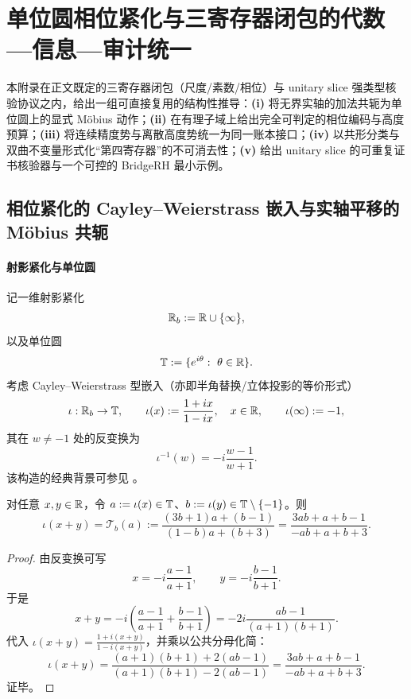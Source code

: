 \section{单位圆相位紧化与三寄存器闭包的代数—信息—审计统一}\label{app:phase-compactification-register-unification}

本附录在正文既定的三寄存器闭包（尺度/素数/相位）与 unitary slice 强类型核验协议之内，给出一组可直接复用的结构性推导：\textbf{(i)} 将无界实轴的加法共轭为单位圆上的显式 Möbius 动作；\textbf{(ii)} 在有理子域上给出完全可判定的相位编码与高度预算；\textbf{(iii)} 将连续精度势与离散高度势统一为同一账本接口；\textbf{(iv)} 以共形分类与双曲不变量形式化“第四寄存器”的不可消去性；\textbf{(v)} 给出 unitary slice 的可重复证书核验器与一个可控的 BridgeRH 最小示例。

\subsection{相位紧化的 Cayley--Weierstrass 嵌入与实轴平移的 Möbius 共轭}\label{subsec:app29-cayley-mobius}

\paragraph{射影紧化与单位圆}
记一维射影紧化
$$
\mathbb{R}_b:=\mathbb{R}\cup\{\infty\},
$$
以及单位圆
$$
\TT:=\{e^{i\theta}:\ \theta\in\RR\}.
$$
考虑 Cayley--Weierstrass 型嵌入（亦即半角替换/立体投影的等价形式）
$$
\iota:\mathbb{R}_b\to\mathbb{T},\qquad
\iota(x):=\frac{1+ix}{1-ix},\quad x\in\mathbb{R},
\qquad
\iota(\infty):=-1,
$$
其在 $w\neq -1$ 处的反变换为
$$
\iota^{-1}(w)=-i\frac{w-1}{w+1}.
$$
该构造的经典背景可参见 \cite{CayleyTransformWiki,TangentHalfAngleWiki}。

\begin{theorem}\label{thm:app29-translation-mobius}
对任意 $x,y\in\mathbb{R}$，令 $a:=\iota(x)\in\mathbb{T}$、$b:=\iota(y)\in\mathbb{T}\setminus\{-1\}$。则
$$
\iota(x+y)=\mathcal{T}_b(a):=\frac{(3b+1)a+(b-1)}{(1-b)a+(b+3)}
=\frac{3ab+a+b-1}{-ab+a+b+3}.
$$
\end{theorem}

\begin{proof}
由反变换可写
$$
x=-i\frac{a-1}{a+1},\qquad
y=-i\frac{b-1}{b+1}.
$$
于是
$$
x+y=-i\left(\frac{a-1}{a+1}+\frac{b-1}{b+1}\right)
=-2i\frac{ab-1}{(a+1)(b+1)}.
$$
代入 $\iota(x+y)=\frac{1+i(x+y)}{1-i(x+y)}$，并乘以公共分母化简：
$$
\iota(x+y)=\frac{(a+1)(b+1)+2(ab-1)}{(a+1)(b+1)-2(ab-1)}
=\frac{3ab+a+b-1}{-ab+a+b+3}.
$$
证毕。
\end{proof}

